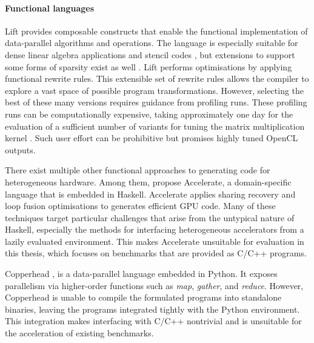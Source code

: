     \paragraph*{Functional languages}
    Lift \citep{steuwer15rewrite} provides composable constructs that enable the
    functional implementation of data-parallel algorithms and operations.
    The language is especially suitable for dense linear algebra applications
    \citep{Steuwer:2016:MMB:2968455.2968521} and stencil codes
    \citep{Hagedorn:2018:HPS:3179541.3168824}, but extensions to support
    some forms of sparsity exist as well
    \citep{Pizzuti:2019:PAA:3331553.3342614}.
    Lift performs optimisations by applying functional rewrite rules.
    This extensible set of rewrite rules allows the compiler to explore a vast
    space of possible program transformations.
    However, selecting the best of these many versions requires guidance
    from profiling runs.
    These profiling runs can be computationally expensive, taking approximately
    one day for the evaluation of a sufficient number of variants for tuning the
    matrix multiplication kernel \citep{Steuwer:2016:MMB:2968455.2968521}.
    Such user effort can be prohibitive but promises highly tuned OpenCL
    outputs.

    There exist multiple other functional approaches to generating code for
    heterogeneous hardware.
    Among them, \citet{chakravarty11accelerating,mcdonell13optimising} propose
    Accelerate, a domain-specific language that is embedded in Haskell.
    Accelerate applies sharing recovery and loop fusion optimisations to
    generates efficient GPU code.
    Many of these techniques target particular challenges that arise
    from the untypical nature of Haskell, especially the methods for interfacing
    heterogeneous accelerators from a lazily evaluated environment.
    This makes Accelerate unsuitable for evaluation in this thesis, which
    focuses on benchmarks that are provided as C/C++ programs.

    Copperhead \citep{catanzaro11copperhead}, is a data-parallel language
    embedded in Python.
    It exposes parallelism via higher-order functions such as {\it map},
    {\it gather}, and {\it reduce}.
    However, Copperhead is unable to compile the formulated programs into
    standalone binaries, leaving the programs integrated tightly with the Python
    environment.
    This integration makes interfacing with C/C++ nontrivial and is unsuitable
    for the acceleration of existing benchmarks.

